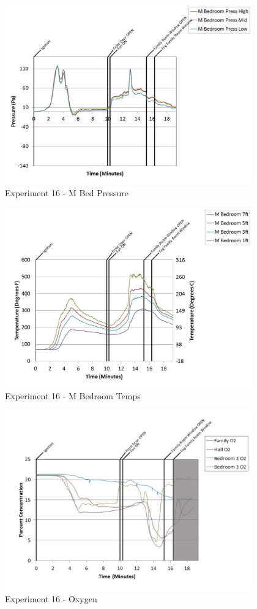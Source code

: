 \documentclass{article}
\begin{document}
\begin{appendices}
	\clearpage

	\begin{figure}[h!]
		\centering
		\includegraphics[height=3.05in]{0_Images/Results_Charts/Exp_16_Charts/MBedPressure.pdf}
		\caption{Experiment 16 - M Bed Pressure}
	\end{figure}
 

	\begin{figure}[h!]
		\centering
		\includegraphics[height=3.05in]{0_Images/Results_Charts/Exp_16_Charts/MBedroomTemps.pdf}
		\caption{Experiment 16 - M Bedroom Temps}
	\end{figure}
 
	\clearpage

	\begin{figure}[h!]
		\centering
		\includegraphics[height=3.05in]{0_Images/Results_Charts/Exp_16_Charts/Oxygen.pdf}
		\caption{Experiment 16 - Oxygen}
	\end{figure}
 


\end{appendices}
\end{document}
